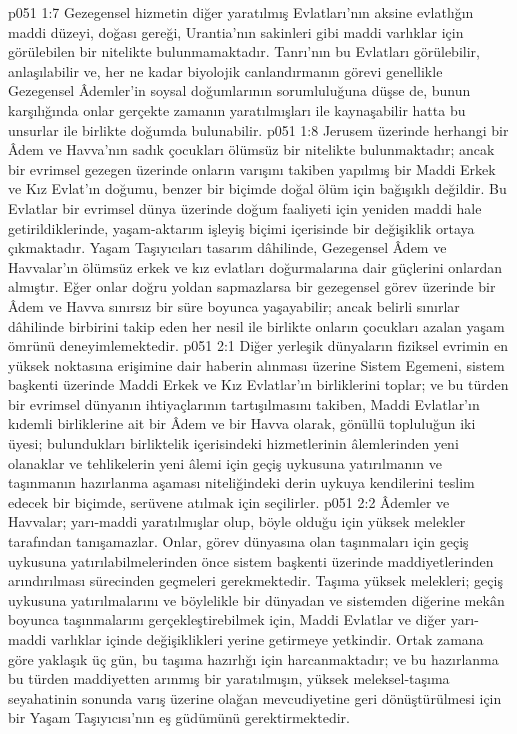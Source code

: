 \vs p051 1:7 Gezegensel hizmetin diğer yaratılmış Evlatları’nın aksine evlatlığın maddi düzeyi, doğası gereği, Urantia’nın sakinleri gibi maddi varlıklar için görülebilen bir nitelikte bulunmamaktadır. Tanrı’nın bu Evlatları görülebilir, anlaşılabilir ve, her ne kadar biyolojik canlandırmanın görevi genellikle Gezegensel Âdemler’in soysal doğumlarının sorumluluğuna düşse de, bunun karşılığında onlar gerçekte zamanın yaratılmışları ile kaynaşabilir hatta bu unsurlar ile birlikte doğumda bulunabilir.
\vs p051 1:8 Jerusem üzerinde herhangi bir Âdem ve Havva’nın sadık çocukları ölümsüz bir nitelikte bulunmaktadır; ancak bir evrimsel gezegen üzerinde onların varışını takiben yapılmış bir Maddi Erkek ve Kız Evlat’ın doğumu, benzer bir biçimde doğal ölüm için bağışıklı değildir. Bu Evlatlar bir evrimsel dünya üzerinde doğum faaliyeti için yeniden maddi hale getirildiklerinde, yaşam\hyp{}aktarım işleyiş biçimi içerisinde bir değişiklik ortaya çıkmaktadır. Yaşam Taşıyıcıları tasarım dâhilinde, Gezegensel Âdem ve Havvalar’ın ölümsüz erkek ve kız evlatları doğurmalarına dair güçlerini onlardan almıştır. Eğer onlar doğru yoldan sapmazlarsa bir gezegensel görev üzerinde bir Âdem ve Havva sınırsız bir süre boyunca yaşayabilir; ancak belirli sınırlar dâhilinde birbirini takip eden her nesil ile birlikte onların çocukları azalan yaşam ömrünü deneyimlemektedir.
\vs p051 2:1 Diğer yerleşik dünyaların fiziksel evrimin en yüksek noktasına erişimine dair haberin alınması üzerine Sistem Egemeni, sistem başkenti üzerinde Maddi Erkek ve Kız Evlatlar’ın birliklerini toplar; ve bu türden bir evrimsel dünyanın ihtiyaçlarının tartışılmasını takiben, Maddi Evlatlar’ın kıdemli birliklerine ait bir Âdem ve bir Havva olarak, gönüllü topluluğun iki üyesi; bulundukları birliktelik içerisindeki hizmetlerinin âlemlerinden yeni olanaklar ve tehlikelerin yeni âlemi için geçiş uykusuna yatırılmanın ve taşınmanın hazırlanma aşaması niteliğindeki derin uykuya kendilerini teslim edecek bir biçimde, serüvene atılmak için seçilirler.
\vs p051 2:2 Âdemler ve Havvalar; yarı\hyp{}maddi yaratılmışlar olup, böyle olduğu için yüksek melekler tarafından tanışamazlar. Onlar, görev dünyasına olan taşınmaları için geçiş uykusuna yatırılabilmelerinden önce sistem başkenti üzerinde maddiyetlerinden arındırılması sürecinden geçmeleri gerekmektedir. Taşıma yüksek melekleri; geçiş uykusuna yatırılmalarını ve böylelikle bir dünyadan ve sistemden diğerine mekân boyunca taşınmalarını gerçekleştirebilmek için, Maddi Evlatlar ve diğer yarı\hyp{}maddi varlıklar içinde değişiklikleri yerine getirmeye yetkindir. Ortak zamana göre yaklaşık üç gün, bu taşıma hazırlığı için harcanmaktadır; ve bu hazırlanma bu türden maddiyetten arınmış bir yaratılmışın, yüksek meleksel\hyp{}taşıma seyahatinin sonunda varış üzerine olağan mevcudiyetine geri dönüştürülmesi için bir Yaşam Taşıyıcısı’nın eş güdümünü gerektirmektedir.

